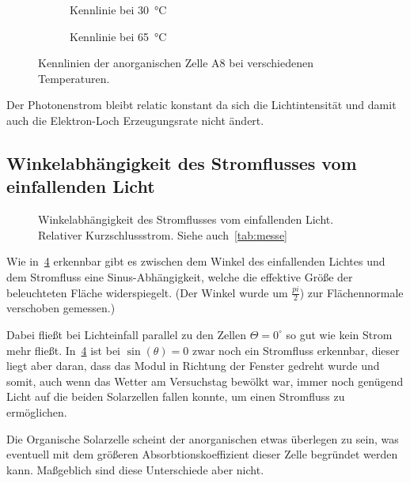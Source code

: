 \documentclass[slug=SZ, room=Hermann-Krone-Bau\,\ Labor\ 1.25,
supervisor=Martin\ Kroll, coursedate=14.\ 11.\ 2019]{../../Lab_Report_LaTeX/lab_report}
\begin{document}
\begin{figure}[H]\centering
  \begin{subfigure}[b]{1\textwidth}\centering
    
    \caption{Kennlinie bei \SI{30}{\degreeCelsius}}
    \label{diag:t30}
  \end{subfigure}
  \begin{subfigure}[b]{1\textwidth}\centering
    
    \caption{Kennlinie bei \SI{65}{\degreeCelsius}}
    \label{diag:t65}
  \end{subfigure}
  \caption{Kennlinien der anorganischen Zelle A8 bei verschiedenen
    Temperaturen.}
  \label{fig:tempccurves}
\end{figure}

Der Photonenstrom bleibt relatic konstant da sich die Lichtintensität
und damit auch die Elektron-Loch Erzeugungsrate nicht \"andert.

\subsection{Winkelabhängigkeit des Stromflusses vom einfallenden Licht}
\label{sec:winkel}

\begin{figure}[H]\centering
        
        \caption{Winkelabhängigkeit des Stromflusses vom einfallenden
          Licht. Relativer Kurzschlussstrom. Siehe auch~\ref{tab:messe}}
        \label{fig:winkel}
\end{figure}

Wie in~\ref{fig:winkel} erkennbar gibt es zwischen dem Winkel des
einfallenden Lichtes und dem Stromfluss eine Sinus-Abhängigkeit,
welche die effektive Gr\"o\ss{}e der beleuchteten Fl\"ache
widerspiegelt. (Der Winkel wurde um \(\frac{pi}{2}\)) zur
Fl\"achennormale verschoben gemessen.)

Dabei flie\ss{}t bei Lichteinfall parallel zu den Zellen
\(\Theta=0^\circ\) so gut wie kein Strom mehr fließt.
In~\ref{fig:winkel} ist bei \(\sin(\theta) = 0\) zwar noch ein
Stromfluss erkennbar, dieser liegt aber daran, dass das Modul in
Richtung der Fenster gedreht wurde und somit, auch wenn das Wetter am
Versuchstag bewölkt war, immer noch genügend Licht auf die beiden
Solarzellen fallen konnte, um einen Stromfluss zu ermöglichen.

Die Organische Solarzelle scheint der anorganischen etwas \"uberlegen
zu sein, was eventuell mit dem gr\"o\ss{}eren Absorbtionskoeffizient
dieser Zelle begr\"undet werden kann. Ma\ss{}geblich sind diese
Unterschiede aber nicht.
\end{document}
